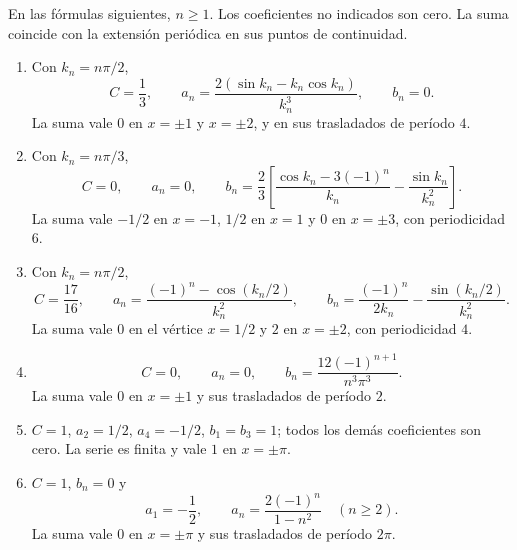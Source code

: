 En las fórmulas siguientes, $n\geq1$. Los coeficientes no indicados son cero. La suma coincide con la extensión periódica en sus puntos de continuidad.

\begin{enumerate}[label=(\alph*),ref=\alph*,leftmargin=*]
\item Con $k_n=n\pi/2$,
\[
C=\frac13,\qquad a_n=\frac{2(\sin k_n-k_n\cos k_n)}{k_n^3},\qquad b_n=0.
\]
La suma vale $0$ en $x=\pm1$ y $x=\pm2$, y en sus trasladados de período $4$.
\item Con $k_n=n\pi/3$,
\[
C=0,\qquad a_n=0,\qquad b_n=\frac23\left[\frac{\cos k_n-3(-1)^n}{k_n}-\frac{\sin k_n}{k_n^2}\right].
\]
La suma vale $-1/2$ en $x=-1$, $1/2$ en $x=1$ y $0$ en $x=\pm3$, con periodicidad $6$.
\item Con $k_n=n\pi/2$,
\[
C=\frac{17}{16},\qquad
a_n=\frac{(-1)^n-\cos(k_n/2)}{k_n^2},\qquad
b_n=\frac{(-1)^n}{2k_n}-\frac{\sin(k_n/2)}{k_n^2}.
\]
La suma vale $0$ en el vértice $x=1/2$ y $2$ en $x=\pm2$, con periodicidad $4$.
\item
\[
C=0,\qquad a_n=0,\qquad b_n=\frac{12(-1)^{n+1}}{n^3\pi^3}.
\]
La suma vale $0$ en $x=\pm1$ y sus trasladados de período $2$.
\item $C=1$, $a_2=1/2$, $a_4=-1/2$, $b_1=b_3=1$; todos los demás coeficientes son cero. La serie es finita y vale $1$ en $x=\pm\pi$.
\item $C=1$, $b_n=0$ y
\[
a_1=-\frac12,\qquad a_n=\frac{2(-1)^n}{1-n^2}\quad(n\geq2).
\]
La suma vale $0$ en $x=\pm\pi$ y sus trasladados de período $2\pi$.
\end{enumerate}

